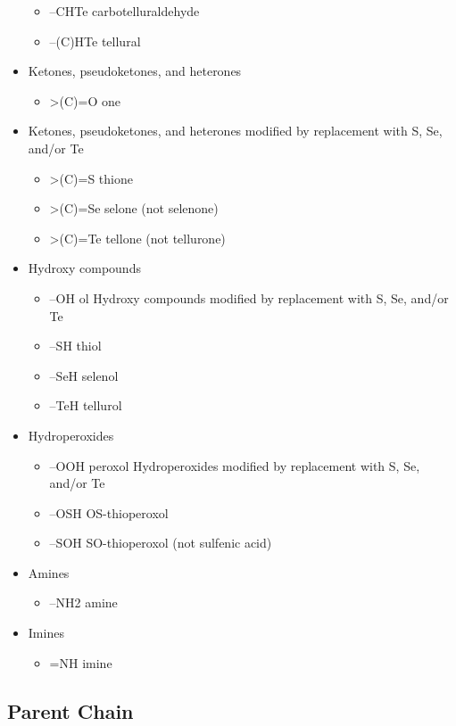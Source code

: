 \documentclass[a4paper,12pt]{report}
\begin{document}
\begin{itemize}
\begin{itemize}
\item –CHTe carbotelluraldehyde 
\item –(C)HTe tellural 
\end{itemize}
\item Ketones, pseudoketones, and heterones 
\begin{itemize}
\item >(C)=O one 
\end{itemize}
\item Ketones, pseudoketones, and heterones modified by replacement with S, Se, and/or Te 
\begin{itemize}
\item >(C)=S thione 
\item >(C)=Se selone (not selenone) 
\item >(C)=Te tellone (not tellurone) 
\end{itemize}
\item Hydroxy compounds 
\begin{itemize}
\item –OH ol Hydroxy compounds modified by replacement with S, Se, and/or Te 
\item –SH thiol 
\item –SeH selenol 
\item –TeH tellurol 
\end{itemize}
\item Hydroperoxides 
\begin{itemize}
\item –OOH peroxol Hydroperoxides modified by replacement with S, Se, and/or Te 
\item –OSH OS-thioperoxol 
\item –SOH SO-thioperoxol (not sulfenic acid) 
\end{itemize}
\item Amines 
\begin{itemize}
\item –NH2 amine 
\end{itemize}
\item Imines
\begin{itemize}
\item =NH imine
\end{itemize}
\end{itemize}
\subsection{Parent Chain}
\end{document}
